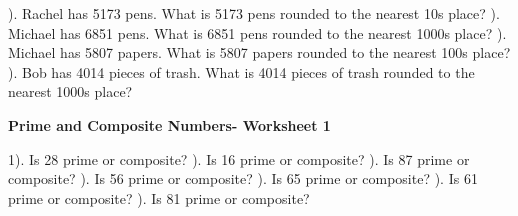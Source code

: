 \documentclass{article}%
\begin{document}
\newline%
\newline%
). Rachel has 5173 pens. What is 5173 pens rounded to the nearest 10s place?%
\newline%
\newline%
). Michael has 6851 pens. What is 6851 pens rounded to the nearest 1000s place?%
\newline%
\newline%
). Michael has 5807 papers. What is 5807 papers rounded to the nearest 100s place?%
\newline%
\newline%
). Bob has 4014 pieces of trash. What is 4014 pieces of trash rounded to the nearest 1000s place?%
\newline%
\newline%
\newline%
\pagebreak%
\large%
\begin{center}%
\textbf{Prime and Composite Numbers- Worksheet 1}%
\newline%
\newline%
\newline%
\end{center} \normalsize%
1). Is 28 prime or composite?%
\newline%
\newline%
). Is 16 prime or composite?%
\newline%
\newline%
). Is 87 prime or composite?%
\newline%
\newline%
). Is 56 prime or composite?%
\newline%
\newline%
). Is 65 prime or composite?%
\newline%
\newline%
). Is 61 prime or composite?%
\newline%
\newline%
). Is 81 prime or composite?%
\newline%
\end{document}
